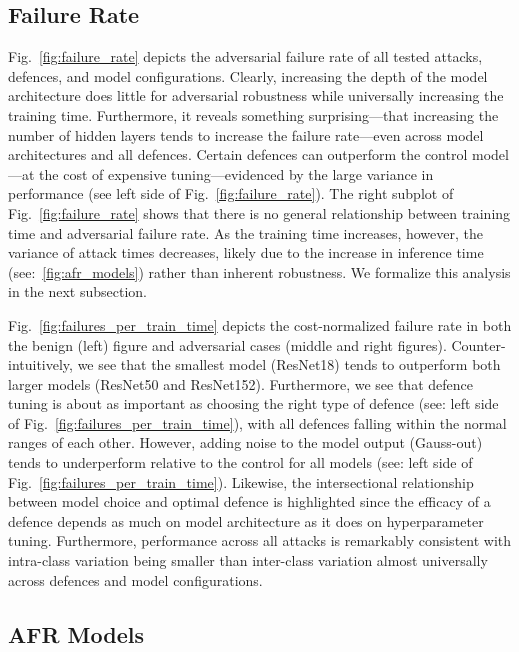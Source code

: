 \subsection{Failure Rate}
Fig.~\ref{fig:failure_rate} depicts the adversarial failure rate of all tested attacks, defences, and model configurations. 
Clearly, increasing the depth of the model architecture does little for adversarial robustness while universally increasing the training time. 
Furthermore, it reveals something surprising---that increasing the number of hidden layers tends to increase the failure rate---even across model architectures and all defences. 
Certain defences can outperform the control model---at the cost of expensive tuning---evidenced by the large variance in performance (see left side of Fig.~\ref{fig:failure_rate}). The right subplot of Fig.~\ref{fig:failure_rate} shows that there is no general relationship between training time and adversarial failure rate.
As the training time increases, however, the variance of attack times decreases, likely due to the increase in inference time (see:~\ref{fig:afr_models}) rather than inherent robustness.
We formalize this analysis  in the next subsection.



Fig.~\ref{fig:failures_per_train_time} depicts the cost-normalized failure rate in both the benign (left) figure and adversarial cases (middle and right figures). Counter-intuitively, we see that the smallest model (ResNet18) tends to outperform both larger models (ResNet50 and ResNet152). Furthermore, we see that defence tuning is about as important as choosing the right type of defence (see: left side of Fig.~\ref{fig:failures_per_train_time}), with all defences falling within the normal ranges of each other. However, adding noise to the model output (Gauss-out) tends to underperform relative to the control for all models (see: left side of Fig.~\ref{fig:failures_per_train_time}). Likewise, the intersectional relationship between model choice and optimal defence is highlighted since the efficacy of a defence depends as much on model architecture as it does on hyperparameter tuning.  Furthermore, performance across all attacks is remarkably consistent with intra-class variation being smaller than inter-class variation almost universally across defences and model configurations.



\subsection{AFR Models}

